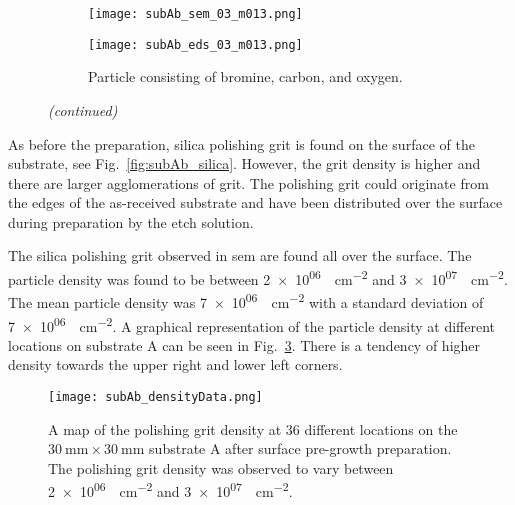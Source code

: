 \begin{figure}[htbp]
\ContinuedFloat
    \centering
    \begin{subfigure}[t]{\textwidth}
          \begin{minipage}[t]{0.49\linewidth}
            \centering
            \texttt{[image: subAb\_sem\_03\_m013.png]}
          \end{minipage}
          \hfill
          \begin{minipage}[t]{0.49\linewidth}
            \centering
            \texttt{[image: subAb\_eds\_03\_m013.png]}
          \end{minipage}
        \caption{Particle consisting of bromine, carbon, and oxygen.}\label{fig:subAb_br-particle}
    \end{subfigure}
    \captionsetup{list=no}
    \caption{\emph{(continued)}}
\end{figure}

As before the preparation, silica polishing grit is found on the surface of the substrate, see Fig.~\ref{fig:subAb_silica}. However, the grit density is higher and there are larger agglomerations of grit. The polishing grit could originate from the edges of the as-received substrate and have been distributed over the surface during preparation by the etch solution.

The silica polishing grit observed in \ac{sem} are found all over the surface. The particle density was found to be between \SI{2e+06}{\particle\centi\metre^{-2}} and \SI{3e+07}{\particle\centi\metre^{-2}}. The mean particle density was \SI{7e+06}{\particle\centi\metre^{-2}} with a standard deviation of \SI{7e+06}{\particle\centi\metre^{-2}}. A graphical representation of the particle density at different locations on substrate A can be seen in Fig.~\ref{fig:subAb_densityData}. There is a tendency of higher density towards the upper right and lower left corners.

\begin{figure}[htbp]
    \centering
    \texttt{[image: subAb\_densityData.png]}
    \caption[Map of the polishing grit density on substrate A after surface pre-growth preparation.]{A map of the polishing grit density at 36 different locations on the $\SI{30}{\milli\metre}\times\SI{30}{\milli\metre}$ substrate A after surface pre-growth preparation. The polishing grit density was observed to vary between \SI{2e+06}{\particle\centi\metre^{-2}} and \SI{3e+07}{\particle\centi\metre^{-2}}.}
    \label{fig:subAb_densityData}
\end{figure}

